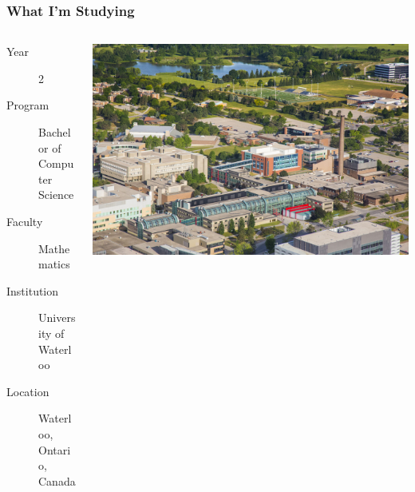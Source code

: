\documentclass[mathserif]{beamer}
\begin{document}
\begin{frame}

\frametitle{What I'm Studying}

\begin{columns}
\begin{column}{.7\textwidth}
\begin{description}
\item[Year] 2
\item[Program] Bachelor of Computer Science
\item[Faculty] Mathematics
\item[Institution] University of Waterloo
\item[Location] Waterloo, Ontario, Canada
\end{description}
\end{column}
\begin{column}{.3\textwidth}
\includegraphics[width=1.0\linewidth]{images/campus.jpg}
\end{column}
\end{columns}

\end{frame}

\end{document}
